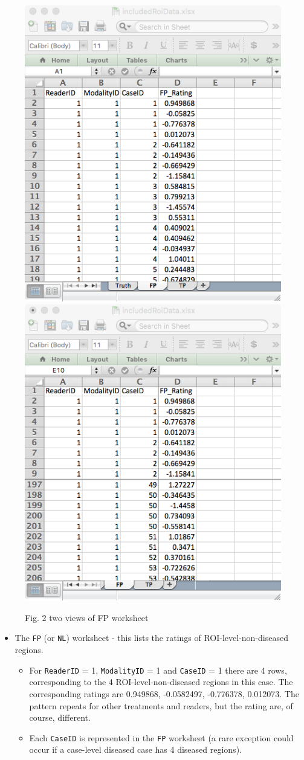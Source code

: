 \documentclass[]{book}
\providecommand{\tightlist}{%
  \setlength{\itemsep}{0pt}\setlength{\parskip}{0pt}}
\begin{document}
\begin{figure}

{\centering \includegraphics[width=0.5\linewidth,height=0.2\textheight]{images/ROI-FP-1} \includegraphics[width=0.5\linewidth,height=0.2\textheight]{images/ROI-FP-2} 

}

\caption{Fig. 2 two views of FP worksheet}\label{fig:unnamed-chunk-4}
\end{figure}

\begin{itemize}
\tightlist
\item
  The \texttt{FP} (or \texttt{NL}) worksheet - this lists the ratings of ROI-level-non-diseased regions.

  \begin{itemize}
  \tightlist
  \item
    For \texttt{ReaderID} = 1, \texttt{ModalityID} = 1 and \texttt{CaseID} = 1 there are 4 rows, corresponding to the 4 ROI-level-non-diseased regions in this case. The corresponding ratings are 0.949868, -0.0582497, -0.776378, 0.012073. The pattern repeats for other treatments and readers, but the rating are, of course, different.\\
  \item
    Each \texttt{CaseID} is represented in the \texttt{FP} worksheet (a rare exception could occur if a case-level diseased case has 4 diseased regions).
  \end{itemize}
\end{itemize}
\end{document}
